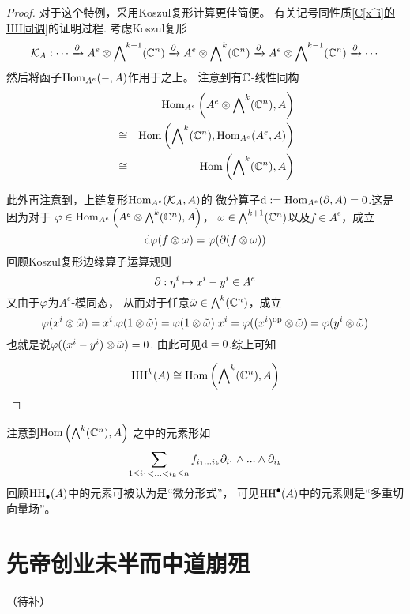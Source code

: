 \begin{proof}
对于这个特例，采用Koszul复形计算更佳简便。
有关记号同性质\ref{C[x^i]的HH同调}的证明过程.
考虑Koszul复形
$$
\mathcal{K}_A:\cdots
\xrightarrow{\partial}A^e\otimes\bigwedge\nolimits^{k+1}(\mathbb{C}^n)
\xrightarrow{\partial}A^e\otimes\bigwedge\nolimits^{k}(\mathbb{C}^n)
\xrightarrow{\partial}A^e\otimes\bigwedge\nolimits^{k-1}(\mathbb{C}^n)
\xrightarrow{\partial}\cdots
$$
然后将函子$\operatorname{Hom}_{A^e}(-,A)$作用于之上。
注意到有$\mathbb{C}$-线性同构
\begin{eqnarray*}
&&      \operatorname{Hom}_{A^e}\left(A^e\otimes\bigwedge\nolimits^{k}(\mathbb{C}^n),A\right)\\
&\cong& \operatorname{Hom}\left(\bigwedge\nolimits^{k}(\mathbb{C}^n),\operatorname{Hom}_{A^e}(A^e,A)\right)\\
&\cong& \operatorname{Hom}\left(\bigwedge\nolimits^{k}(\mathbb{C}^n),A\right)
\end{eqnarray*}

此外再注意到，上链复形$\operatorname{Hom}_{A^e}(\mathcal{K}_A,A)$的
微分算子$\textrm{d}:=\operatorname{Hom}_{A^e}(\partial,A)=0$.这是因为对于
$\varphi\in\operatorname{Hom}_{A^e}\left(A^e\otimes\bigwedge\nolimits^{k}(\mathbb{C}^n),A\right)$，
$\omega\in\bigwedge\nolimits^{k+1}(\mathbb{C}^n)$以及$f\in A^e$，成立
$$\textrm{d}\varphi(f\otimes\omega)=\varphi(\partial(f\otimes\omega))$$
回顾Koszul复形边缘算子运算规则
$$\partial:\eta^i\mapsto x^i-y^i\in A^e$$
又由于$\varphi$为$A^e$-模同态，
从而对于任意$\tilde{\omega}\in\bigwedge\nolimits^{k}(\mathbb{C}^n)$，成立
$$
\varphi(x^i\otimes\tilde{\omega})
=x^i.\varphi(1\otimes\tilde{\omega})
=\varphi(1\otimes\tilde{\omega}).x^i
=\varphi((x^i)^{\text{op}}\otimes\tilde{\omega})
=\varphi(y^i\otimes\tilde{\omega})$$
也就是说$\varphi((x^i-y^i)\otimes\tilde{\omega})=0$.
由此可见$\textrm{d}=0$.综上可知

$$\operatorname{HH}^k(A)\cong
\operatorname{Hom}\left(\bigwedge\nolimits^{k}(\mathbb{C}^n),A\right)$$

\end{proof}

注意到$\operatorname{Hom}\left(\bigwedge\nolimits^{k}(\mathbb{C}^n),A\right)$
之中的元素形如
$$
\sum_{1\leq i_1<...<i_k\leq n}
f_{i_1...i_k}\partial_{i_1}\wedge...\wedge\partial_{i_k}
$$
回顾$\operatorname{HH}_{\bullet}(A)$中的元素可被认为是“微分形式”，
可见$\operatorname{HH}^{\bullet}(A)$中的元素则是“多重切向量场”。

\section{先帝创业未半而中道崩殂}

（待补）




